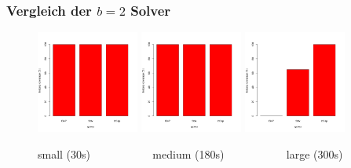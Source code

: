 \documentclass{beamer}
\begin{document}
\begin{frame}
\frametitle{Vergleich der $b = 2$ Solver}

\begin{figure}
\centering
\includegraphics[width=0.3\textwidth]{images/solver_instance_coverage_small_b=2.png}
\includegraphics[width=0.3\textwidth]{images/solver_instance_coverage_mid_b=2.png}
\includegraphics[width=0.3\textwidth]{images/solver_instance_coverage_big_b=2.png}
\caption*{small (30s) $\quad\quad\quad\quad\quad$ medium (180s) $\quad\quad\quad\quad\quad$ large (300s)}
\end{figure}
\begin{figure}[H]
\begin{subfigure}[b]{0.4\textwidth}
\centering
{}
\end{subfigure}
\end{figure}
\end{frame}
\end{document}
